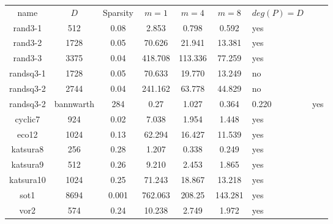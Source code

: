 \begin{tabular}{c|c|c|c|c|c}
name      & $D$ & Sparsity & $m = 1$ & $m = 4$ & $m = 8$ & $deg(P) = D$\\
rand3-1   & 512 & 0.08     & 2.853   & 0.798   & 0.592   & yes \\
rand3-2   & 1728& 0.05     & 70.626  & 21.941  & 13.381  & yes \\
rand3-3   & 3375& 0.04     & 418.708 & 113.336 & 77.259  & yes \\
randsq3-1 & 1728& 0.05     & 70.633  & 19.770  & 13.249  & no  \\
randsq3-2 & 2744& 0.04     & 241.162 & 63.778  & 44.829  & no  \\
randsq3-2 & 
bannwarth & 284 & 0.27     & 1.027   & 0.364   & 0.220   & yes \\
cyclic7   & 924 & 0.02     & 7.038   & 1.954   & 1.448   & yes \\
eco12     & 1024& 0.13     & 62.294  & 16.427  & 11.539  & yes \\
katsura8  & 256 & 0.28     & 1.207   & 0.338   & 0.249   & yes \\
katsura9  & 512 & 0.26     & 9.210   & 2.453   & 1.865   & yes \\
katsura10 & 1024& 0.25     & 71.243  & 18.867  & 13.218  & yes \\
sot1      & 8694& 0.001    & 762.063 & 208.25  & 143.281 & yes \\
vor2      & 574 & 0.24     & 10.238  & 2.749   & 1.972   & yes 
\end{tabular}
